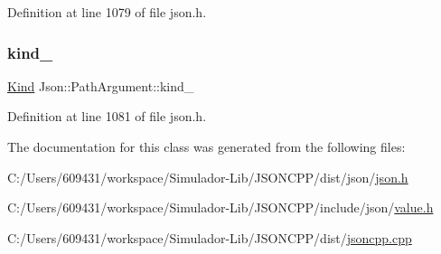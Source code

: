 Definition at line 1079 of file json.\+h.

\hypertarget{class_json_1_1_path_argument_ad4bc4b544b155a3d9c7788572ecf991b}{}\label{class_json_1_1_path_argument_ad4bc4b544b155a3d9c7788572ecf991b} 
\subsubsection{\texorpdfstring{kind\+\_\+}{kind\_}}
{\footnotesize\ttfamily \hyperlink{class_json_1_1_path_argument_a2420bbad778573c147e578701b84d9b9}{Kind} Json\+::\+Path\+Argument\+::kind\+\_\+\hspace{0.3cm}{\ttfamily [private]}}



Definition at line 1081 of file json.\+h.



The documentation for this class was generated from the following files\+:\begin{DoxyCompactItemize}
\item 
C\+:/\+Users/609431/workspace/\+Simulador-\/\+Lib/\+J\+S\+O\+N\+C\+P\+P/dist/json/\hyperlink{dist_2json_2json_8h}{json.\+h}\item 
C\+:/\+Users/609431/workspace/\+Simulador-\/\+Lib/\+J\+S\+O\+N\+C\+P\+P/include/json/\hyperlink{value_8h}{value.\+h}\item 
C\+:/\+Users/609431/workspace/\+Simulador-\/\+Lib/\+J\+S\+O\+N\+C\+P\+P/dist/\hyperlink{jsoncpp_8cpp}{jsoncpp.\+cpp}\end{DoxyCompactItemize}
